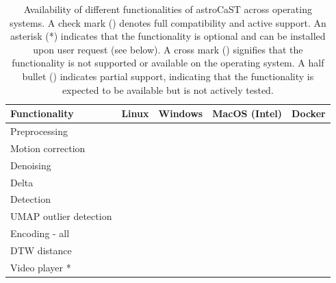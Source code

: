 \documentclass[utf8]{FrontiersinHarvard}
\newcommand{\cmark}{\ding{51}} %
\newcommand{\xmark}{\textemdash} %
\newcommand{\halfbullet}{\LEFTcircle} %
\newcommand{\optional}{*} %
\begin{document}
    \bgroup
    \def\arraystretch{1.5}
    \begin{table}[htb]
        \centering
        \caption{Availability of different functionalities of astroCaST across
        operating systems. A check mark (\cmark) denotes full compatibility and active support. An asterisk (\optional)
            indicates that the
            functionality is optional and can be installed upon user request (see below). A cross mark (\xmark) signifies
            that the
            functionality is not supported or available on the operating system. A half bullet (\halfbullet) indicates
            partial support,
            indicating that the functionality is expected to be available but is not actively tested. \newline}
        \label{tab:functionalities}
        \begin{tabular}{|l|c|c|c|c|}
            \hline
            \textbf{Functionality} & \textbf{Linux} & \textbf{Windows} & \textbf{MacOS (Intel)} & \textbf{Docker} \\ \hline
            Preprocessing          & \cmark         & \cmark           & \cmark                 & \cmark          \\ \hline
            Motion correction      & \cmark         & \cmark           & \cmark                 & \cmark          \\ \hline
            Denoising              & \cmark         & \halfbullet      & \cmark                 & \cmark          \\ \hline
            Delta                  & \cmark         & \cmark           & \cmark                 & \cmark          \\ \hline
            Detection              & \cmark         & \cmark           & \cmark                 & \cmark          \\ \hline
            UMAP outlier detection & \cmark         & \cmark           & \xmark                 & \cmark          \\ \hline
            Encoding - all         & \cmark         & \cmark           & \cmark                 & \cmark          \\ \hline
            DTW distance           & \cmark         & \cmark           & \xmark                 & \cmark          \\ \hline
            Video player \optional & \cmark         & \cmark           & \cmark                 & \xmark          \\ \hline
        \end{tabular}
    \end{table}
    \egroup
\end{document}
